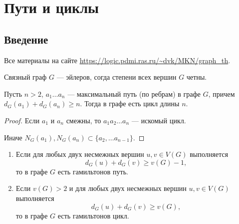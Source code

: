 \chapter{Пути и циклы} 
\section{Введение}

Все материалы на сайте \url{https://logic.pdmi.ras.ru/~dvk/MKN/graph_th}.

\begin{theorem}
	Связный граф $G$ --- эйлеров, согда степени всех вершин $G$ четны.
\end{theorem}

\begin{definition}[]
\end{definition}

\begin{st}
    Пусть $n > 2$, $a_1 \ldots a_n$ --- максимальный путь (по ребрам) в графе $G$, причем $d_{G}(a_1) + d_{G}(a_{n}) \ge n$. Тогда в графе есть цикл длины $n$.
\end{st}
\begin{proof}
    Если $a_1$ и $a_{n}$ смежны, то $a_1a_2\ldots a_{n}$ --- искомый цикл.

	Иначе $N_{G}(a_1), N_{G}(a_{n}) \subset \{a_2, \ldots a_{n-1}\}$.
\end{proof}

\begin{theorem}
	\begin{enumerate}
		\item Если для любых двух несмежных вершин $u, v \in V(G)$ выполняется 
			\[
			d_G(u) + d_{G}(v) \ge v(G) - 1
			,\] 
			то в графе $G$ есть гамильтонов путь.
		\item Если  $v(G) > 2$ и для любых двух несмежных вершин  $u, v \in V(G)$ выполняется
			\[
			d_{G}(u) + d_{G}(v) \ge v(G)
			,\] 
			то в графе $G$ есть гамильтонов цикл.
	\end{enumerate}
\end{theorem}
